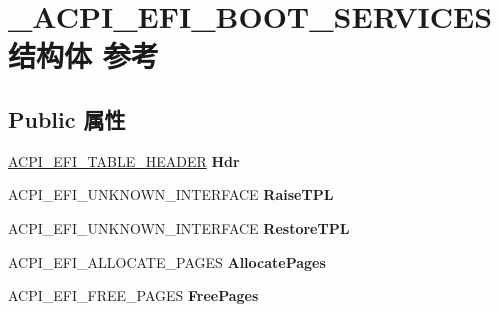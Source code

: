 \hypertarget{struct___a_c_p_i___e_f_i___b_o_o_t___s_e_r_v_i_c_e_s}{}\section{\+\_\+\+A\+C\+P\+I\+\_\+\+E\+F\+I\+\_\+\+B\+O\+O\+T\+\_\+\+S\+E\+R\+V\+I\+C\+E\+S结构体 参考}
\label{struct___a_c_p_i___e_f_i___b_o_o_t___s_e_r_v_i_c_e_s}
\subsection*{Public 属性}
\begin{DoxyCompactItemize}
\item 
\mbox{\label{struct___a_c_p_i___e_f_i___b_o_o_t___s_e_r_v_i_c_e_s_acfbe777f44cba5b22495f48b9b6dce2d}} 
\hyperlink{struct___a_c_p_i___e_f_i___t_a_b_l_e___h_e_a_r_d_e_r}{A\+C\+P\+I\+\_\+\+E\+F\+I\+\_\+\+T\+A\+B\+L\+E\+\_\+\+H\+E\+A\+D\+ER} {\bfseries Hdr}
\item 
\mbox{\label{struct___a_c_p_i___e_f_i___b_o_o_t___s_e_r_v_i_c_e_s_a423bd5128d1a45d535f4a709d31caa20}} 
A\+C\+P\+I\+\_\+\+E\+F\+I\+\_\+\+U\+N\+K\+N\+O\+W\+N\+\_\+\+I\+N\+T\+E\+R\+F\+A\+CE {\bfseries Raise\+T\+PL}
\item 
\mbox{\label{struct___a_c_p_i___e_f_i___b_o_o_t___s_e_r_v_i_c_e_s_ac52063852e86b82ec05ae5de9113c47a}} 
A\+C\+P\+I\+\_\+\+E\+F\+I\+\_\+\+U\+N\+K\+N\+O\+W\+N\+\_\+\+I\+N\+T\+E\+R\+F\+A\+CE {\bfseries Restore\+T\+PL}
\item 
\mbox{\label{struct___a_c_p_i___e_f_i___b_o_o_t___s_e_r_v_i_c_e_s_a2470253146b9b66e376e3845c9e17c47}} 
A\+C\+P\+I\+\_\+\+E\+F\+I\+\_\+\+A\+L\+L\+O\+C\+A\+T\+E\+\_\+\+P\+A\+G\+ES {\bfseries Allocate\+Pages}
\item 
\mbox{\label{struct___a_c_p_i___e_f_i___b_o_o_t___s_e_r_v_i_c_e_s_aad7c0fff0230638b3c19988b11f77624}} 
A\+C\+P\+I\+\_\+\+E\+F\+I\+\_\+\+F\+R\+E\+E\+\_\+\+P\+A\+G\+ES {\bfseries Free\+Pages}

\end{DoxyCompactItemize}
